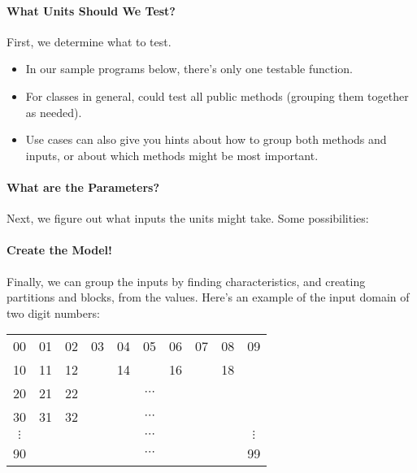 \documentclass[11pt]{article}
\begin{document}
\paragraph{What Units Should We Test?} First, we determine what to test.

\begin{itemize}
\item In our sample programs below, there's only one testable
  function.
\item For classes in general, could test all public methods (grouping
  them together as needed).
\item Use cases can also give you hints about how to group both
  methods and inputs, or about which methods might be most important.
\end{itemize}

\paragraph{What are the Parameters?} Next, we figure out what inputs the
units might take. {\sf Some possibilities:}\\[4em]


\paragraph{Create the Model!} Finally, we can group the inputs by finding
characteristics, and creating partitions and blocks, from the values.
Here's an example of the input domain of two digit numbers:

\begin{center}
\begin{tabular}{cccccccccc}
00 & 01 & 02 & 03 & 04 & 05 & 06 & 07 & 08 & 09 \\
10 & 11 & 12 &    & 14 &        & 16 &    & 18 & \\
20 & 21 & 22 &    &    & $\cdots$ &    &    &    & \\
30 & 31 & 32 &    &    & $\cdots$ &    &    &    & \\
$\vdots$ &    &    &    &    & $\cdots$  & & & & $\vdots$ \\
90 &    &    &    &    & $\cdots$  & & & & 99
\end{tabular}
\end{center}
\end{document}
